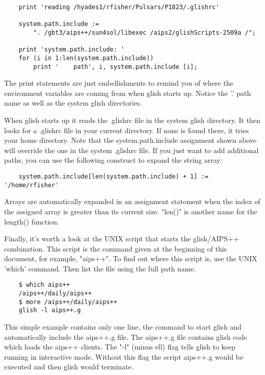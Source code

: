 \begin{verbatim}
	print 'reading /hyades1/rfisher/Pulsars/P1823/.glishrc'
 
	system.path.include := 
	    ". /gbt3/aips++/sun4sol/libexec /aips2/glishScripts-2509a /";
 
	print 'system.path.include: '
	for (i in 1:len(system.path.include))
	    print '    path', i, system.path.include [i];
\end{verbatim}

The print statements are just embellishments to remind you of where the
environment variables are coming from when glish starts up.  Notice the '.'
path name as well as the system glish directories.

    When glish starts up it reads the .glishrc file in the system glish
directory.  It then looks for a .glishrc file in your current directory.
If none is found there, it tries your home directory.  Note that the
system.path.include assignment shown above will override the one in the
system .glishrc file.  If you just want to add additional paths, you can
use the following construct to expand the string array:

\begin{verbatim}
	system.path.include[len(system.path.include) + 1] := '/home/rfisher'
\end{verbatim}

Arrays are automatically expanded in an assignment statement when the
index of the assigned array is greater than its current size.  "len()" is
another name for the length() function.

    Finally, it's worth a look at the UNIX script that starts the
glish/AIPS++ combination.  This script is the command given at the
beginning of this document, for example, "aips++".  To find out where this
script is, use the UNIX 'which' command.  Then list the file using the full
path name.

\begin{verbatim}
	$ which aips++
	/aips++/daily/aips++
	$ more /aips++/daily/aips++
	glish -l aips++.g
\end{verbatim}

This simple example contains only one line, the command to start glish and
automatically include the aips++.g file.  The aips++.g file contains glish
code which loads the aips++ clients.  The "-l" (minus ell) flag tells glish
to keep running in interactive mode.  Without this flag the script aips++.g
would be executed and then glish would terminate.

